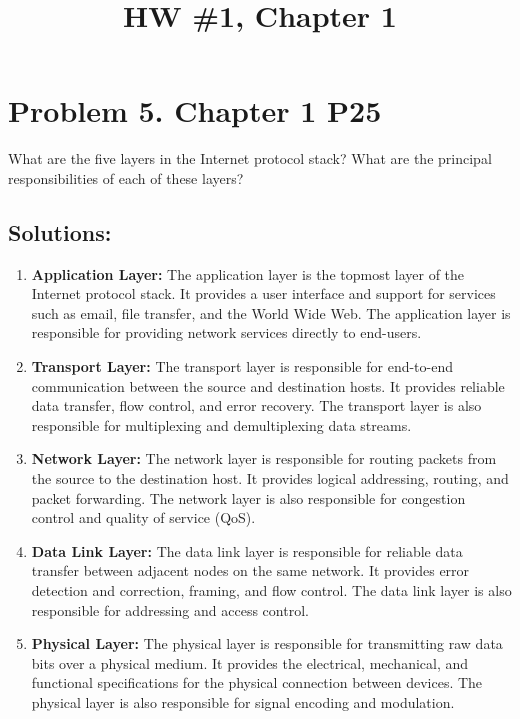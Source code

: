 \documentclass{cshwk}
\begin{document}
\title{HW \#1, Chapter 1}

\maketitle

\section*{Problem 5. Chapter 1 P25}
            What are the five layers in the Internet protocol stack? What are the principal responsibilities of each of these layers?

\subsection*{Solutions:}

\begin{enumerate}
    \item \textbf{Application Layer:} The application layer is the topmost layer of the Internet protocol stack. It provides a user interface and support for services such as email, file transfer, and the World Wide Web. The application layer is responsible for providing network services directly to end-users.
    \item \textbf{Transport Layer:} The transport layer is responsible for end-to-end communication between the source and destination hosts. It provides reliable data transfer, flow control, and error recovery. The transport layer is also responsible for multiplexing and demultiplexing data streams.
    \item \textbf{Network Layer:} The network layer is responsible for routing packets from the source to the destination host. It provides logical addressing, routing, and packet forwarding. The network layer is also responsible for congestion control and quality of service (QoS).
    \item \textbf{Data Link Layer:} The data link layer is responsible for reliable data transfer between adjacent nodes on the same network. It provides error detection and correction, framing, and flow control. The data link layer is also responsible for addressing and access control.
    \item \textbf{Physical Layer:} The physical layer is responsible for transmitting raw data bits over a physical medium. It provides the electrical, mechanical, and functional specifications for the physical connection between devices. The physical layer is also responsible for signal encoding and modulation.
\end{enumerate}
\end{document}
